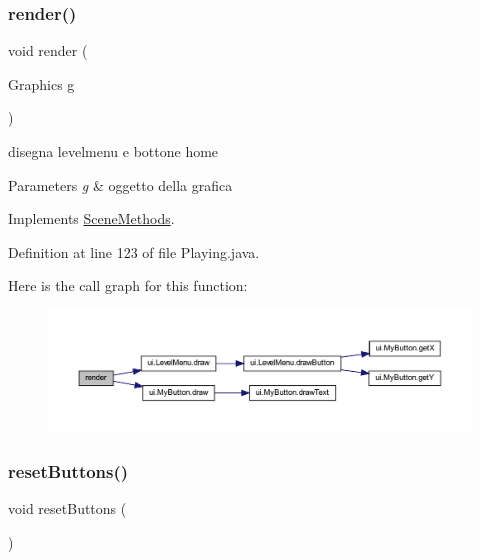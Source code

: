 \subsubsection{\texorpdfstring{render()}{render()}}
{\footnotesize\ttfamily void render (\begin{DoxyParamCaption}\item[{Graphics}]{g }\end{DoxyParamCaption})}



disegna levelmenu e bottone home 


\begin{DoxyParams}{Parameters}
{\em g} & oggetto della grafica \\
\hline
\end{DoxyParams}


Implements \hyperlink{interfacescenes_1_1_scene_methods_a203b6ad9d5e4d54dd1152986eec4dedc}{Scene\+Methods}.



Definition at line 123 of file Playing.\+java.

Here is the call graph for this function\+:\nopagebreak
\begin{figure}[H]
\begin{center}
\leavevmode
\includegraphics[width=350pt]{classscenes_1_1_playing_a203b6ad9d5e4d54dd1152986eec4dedc_cgraph}
\end{center}
\end{figure}
\mbox{\label{classscenes_1_1_playing_a548cf4795e9d559d0c0cce0bb57a5251}} 
\subsubsection{\texorpdfstring{reset\+Buttons()}{resetButtons()}}
{\footnotesize\ttfamily void reset\+Buttons (\begin{DoxyParamCaption}{ }\end{DoxyParamCaption})\hspace{0.3cm}{\ttfamily [private]}}



